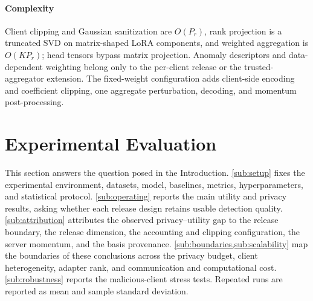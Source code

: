 \documentclass[a4paper,fleqn]{cas-dc}
\begin{document}
\paragraph{Complexity}
Client clipping and Gaussian sanitization are $O(P_r)$, rank projection is a
truncated SVD on matrix-shaped LoRA components, and weighted aggregation is
$O(KP_r)$; head tensors bypass matrix projection. Anomaly descriptors and
data-dependent weighting belong only to the per-client release or the
trusted-aggregator extension. The fixed-weight configuration adds
client-side encoding and coefficient clipping, one aggregate perturbation,
decoding, and momentum post-processing.
\par
\section{Experimental Evaluation}
\label{sec:evaluation}
\par
This section answers the question posed in the Introduction. \cref{sub:setup} fixes the experimental environment, datasets, model, baselines, metrics, hyperparameters, and statistical protocol. \cref{sub:operating} reports the main utility and privacy results, asking whether each release design retains usable detection quality. \cref{sub:attribution} attributes the observed privacy--utility gap to the release boundary, the release dimension, the accounting and clipping configuration, the server momentum, and the basis provenance. \cref{sub:boundaries,sub:scalability} map the boundaries of these conclusions across the privacy budget, client heterogeneity, adapter rank, and communication and computational cost. \cref{sub:robustness} reports the malicious-client stress tests. Repeated runs are reported as mean and sample standard deviation.
\par
\end{document}
